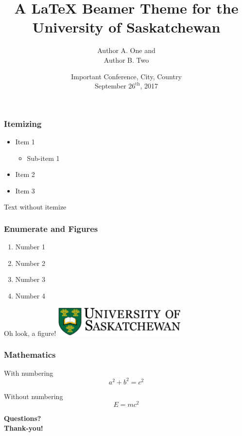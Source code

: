 \documentclass[t]{beamer}
\title{A \LaTeX{} Beamer Theme for the University of Saskatchewan}
\date{Important Conference, City, Country \\ September $26^{\text{th}}$, 2017} %
\author{Author A. One and  \\ Author B. Two}
\institute{Department of Something} %
\begin{document}
\begin{frame}
	\titlepage
\end{frame}

\begin{frame}
	\frametitle{Itemizing} 
	\begin{itemize}
	\item Item 1
		\begin{itemize}
		\item Sub-item 1
		\end{itemize}
	\item Item 2
	\item Item 3
	\end{itemize}

	Text without itemize
\end{frame}

\begin{frame}
	\frametitle{Enumerate and Figures} 

	\begin{enumerate}
	\item Number 1
	\item Number 2
	\item Number 3
	\item Number 4
	\end{enumerate}

	Oh look, a figure!
 	\vskip1cm
	\centering
	\includegraphics[width=0.5\textwidth]{UsaskLogo.jpg}
\end{frame}

\begin{frame}
	\frametitle{Mathematics}

	With numbering
	\begin{equation}
	a^2 + b^2 = c^2
	\end{equation}

	Without numbering
	\begin{equation*}
	E = mc^2
	\end{equation*}

\end{frame}

\begin{frame}[c]
	\begin{center}
	\bfseries \huge \color{Headline}Questions?\\
	\bfseries \Large \color{Date} Thank-you!
	\end{center}
\end{frame}
\end{document}
